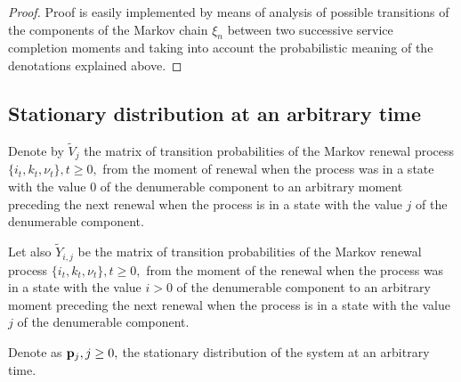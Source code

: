 \documentclass[runningheads]{llncs}
\begin{document}
\begin{proof} Proof is easily implemented by means of analysis of possible transitions of the components of the Markov chain $\xi_n$ between two successive service completion moments and taking into account the probabilistic meaning of the denotations explained above.
\end{proof}


\subsection{Stationary distribution at an arbitrary time}



Denote by $\tilde {V}_j$ the matrix of transition probabilities of the Markov renewal process $\{i_t, k_t,\nu_t\}, t\geq0,$ from the moment of  renewal when the process was in a state with the value  $0$ of the denumerable component to an  arbitrary moment preceding the next renewal when the process is  in a state with the value  $j$ of the denumerable component.

Let also  $\tilde{Y}_{i,j}$ be the matrix of transition probabilities of the Markov renewal process $\{i_t, k_t,\nu_t\}, t\geq0,$ from the moment of the renewal when the process was in a state with the value  $i>0$ of the denumerable component to an  arbitrary moment preceding the next renewal when the process is  in a state with the value  $j$ of the denumerable component.

Denote as ${\bf p}_j, j\geq 0, $ the stationary distribution of the system at an arbitrary time.
\end{document}
